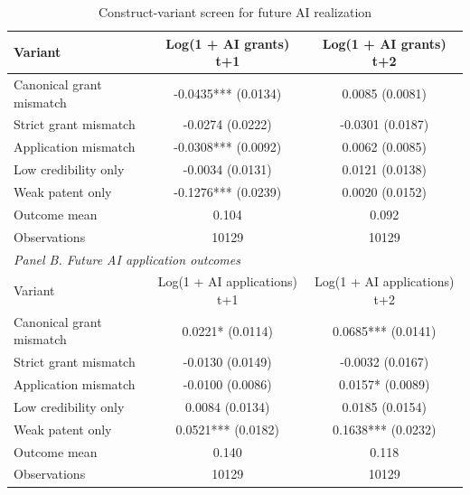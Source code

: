 \begin{table}[!htbp]
\centering
\caption{Construct-variant screen for future AI realization}
\label{tab:construct_variant_screen}
\begin{tabular}{lcc}
\hline
Variant & Log(1 + AI grants) t+1 & Log(1 + AI grants) t+2 \\
\hline
Canonical grant mismatch & -0.0435*** (0.0134) & 0.0085 (0.0081) \\
Strict grant mismatch & -0.0274 (0.0222) & -0.0301 (0.0187) \\
Application mismatch & -0.0308*** (0.0092) & 0.0062 (0.0085) \\
Low credibility only & -0.0034 (0.0131) & 0.0121 (0.0138) \\
Weak patent only & -0.1276*** (0.0239) & 0.0020 (0.0152) \\
Outcome mean & 0.104 & 0.092 \\
Observations & 10129 & 10129 \\
\hline
\multicolumn{3}{l}{\textit{Panel B. Future AI application outcomes}} \\
Variant & Log(1 + AI applications) t+1 & Log(1 + AI applications) t+2 \\
\hline
Canonical grant mismatch & 0.0221* (0.0114) & 0.0685*** (0.0141) \\
Strict grant mismatch & -0.0130 (0.0149) & -0.0032 (0.0167) \\
Application mismatch & -0.0100 (0.0086) & 0.0157* (0.0089) \\
Low credibility only & 0.0084 (0.0134) & 0.0185 (0.0154) \\
Weak patent only & 0.0521*** (0.0182) & 0.1638*** (0.0232) \\
Outcome mean & 0.140 & 0.118 \\
Observations & 10129 & 10129 \\
\hline
\end{tabular}
\end{table}
